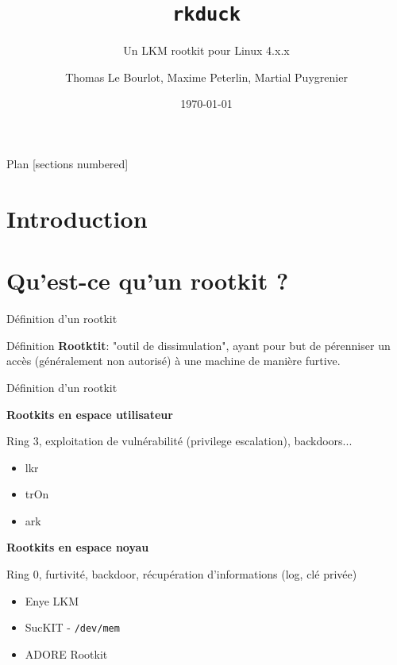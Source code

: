\documentclass[10pt]{beamer}
\title{\texttt{rkduck}}
\subtitle{Un LKM rootkit pour Linux 4.x.x}
\date{\today}
\author{Thomas Le Bourlot, Maxime Peterlin, Martial Puygrenier}
\institute{Université de Bordeaux}
\begin{document}
\maketitle

\begin{frame}{Plan}
  [sections numbered]
  \tableofcontents[hideallsubsections]
\end{frame}

\section*{Introduction}


\section{Qu'est-ce qu'un rootkit ?}


	

	\begin{frame}{Définition d'un rootkit}
	
	\begin{alertblock}{Définition}
		\textbf{Rootktit}: "outil de dissimulation", ayant pour but de pérenniser un accès (généralement non autorisé) à une machine de manière furtive.
    \end{alertblock}
    
	\end{frame}
	
		\begin{frame}{Définition d'un rootkit}

			\textbf{Rootkits en espace utilisateur}
			
			Ring 3, exploitation de vulnérabilité (privilege escalation), backdoors...
			\begin{itemize}
				\item lkr
				\item trOn
				\item ark
			\end{itemize}
			
			\textbf{Rootkits en espace noyau}
			
			Ring 0, furtivité, backdoor, récupération d'informations (log, clé privée)
			\begin{itemize}
				\item Enye LKM
				\item SucKIT - \texttt{/dev/mem}
				\item ADORE Rootkit
			\end{itemize}
		\end{frame}
\end{document}
